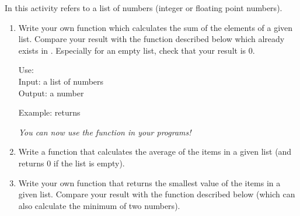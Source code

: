 \documentclass[11pt,class=report,crop=false]{standalone}
\begin{document}




\begin{activite}


In this activity  refers to a list of numbers (integer or floating point numbers). 

\begin{enumerate}
  \item Write your own function  which calculates the sum of the elements of a given list.
  Compare your result with the  function described below which already exists in \Python{}. Especially for an empty list, check that your result is $0$. 
  
  
  \begin{fonctionpython}
   Use: \\
   Input: a list of numbers\\
   Output: a number
  
  \medskip
     
  Example:  returns 
  \end{fonctionpython}   
  
  \emph{You can now use the function  in your programs!}
  
  
  \item Write a  function that calculates the average of the items in a given list (and returns $0$ if the list is empty). 
  
  \item Write your own  function that returns the smallest value of the items in a given list. Compare your result with the \Python{}  function described below (which can also calculate the minimum of two numbers).
  

\end{enumerate}
\end{activite}
\end{document}
